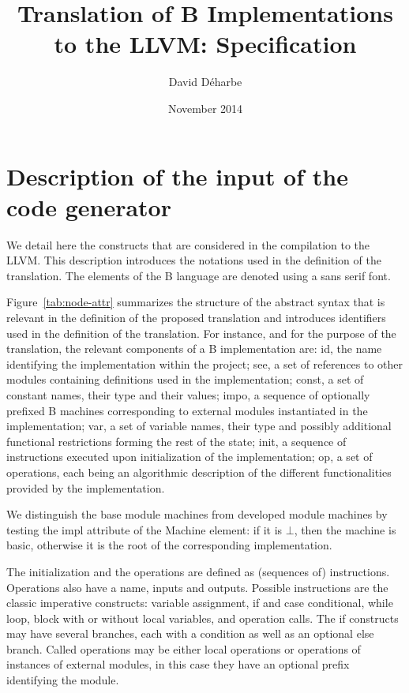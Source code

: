 \documentclass{llncs}
\title{Translation of B Implementations to the LLVM: Specification}
\author{David Déharbe}
\institute{Universidade Federal do Rio Grande do Norte -- UFRN \\
  Departamento de Informática e Matemática Aplicada -- DIMAp \\
 Natal, RN (Brazil) \\
\texttt{david@dimap.ufrn.br}}
\date{November 2014}
\newcommand{\B}[1]{\textsf{#1}}
\begin{document}
\maketitle

\section{Description of the input of the code generator}
\label{sec:b-ast}

We detail here the constructs that are considered in the compilation to the
LLVM. This description introduces the notations used in the definition of the
translation. The elements of the B language are denoted using a \B{sans serif}
font.

Figure~\ref{tab:node-attr} summarizes the structure
of the abstract syntax that is relevant in the definition of the proposed
translation and introduces identifiers used in the definition of the
translation. For instance, and for the purpose of the translation, the relevant
components of a B implementation are: \B{id}, the name identifying the
implementation within the project; \B{see}, a set of references to other modules
containing definitions used in the implementation; \B{const}, a set of constant
names, their type and their values; \B{impo}, a sequence of optionally
prefixed B machines corresponding to external modules instantiated in the
implementation; \B{var}, a set of variable names, their type and possibly
additional functional restrictions forming the rest of the state; \B{init}, a
sequence of instructions executed upon initialization of the implementation;
\B{op}, a set of operations, each being an algorithmic description of the
different functionalities provided by the implementation.

We distinguish the base module machines from developed module machines by
testing the \B{impl} attribute of the \B{Machine} element: if it is $\bot$, then
the machine is basic, otherwise it is the root of the corresponding
implementation.

The initialization and the operations are defined as (sequences of)
instructions. Operations also have a name, inputs and outputs. Possible
instructions are the classic imperative constructs: variable assignment, if and
case conditional, while loop, block with or without local variables, and
operation calls. The if constructs may have several branches, each with a
condition as well as an optional else branch. Called operations may be either
local operations or operations of instances of external modules, in this case
they have an optional prefix identifying the module.
\end{document}

